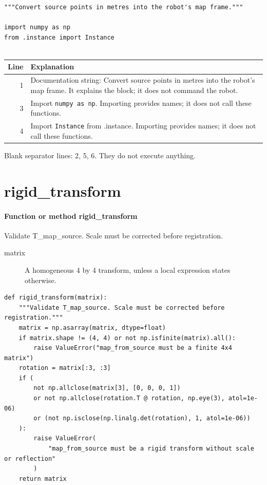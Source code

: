 \documentclass[11pt,a4paper]{book}
\begin{document}
\begin{lstlisting}[firstnumber=1]
"""Convert source points in metres into the robot's map frame."""

import numpy as np
from .instance import Instance


\end{lstlisting}

\begin{longtable}{r p{}}

\textbf{Line} & \textbf{Explanation} \\ \hline \endhead

1 & Documentation string: Convert source points in metres into the robot's map frame. It explains the block; it does not command the robot. \\

3 & Import \texttt{numpy as np}. Importing provides names; it does not call these functions. \\

4 & Import \texttt{Instance} from .instance. Importing provides names; it does not call these functions. \\

\end{longtable}

Blank separator lines: 2, 5, 6. They do not execute anything.

\section{rigid\_transform}

\paragraph{Function or method rigid\_transform}
Validate T\_map\_source. Scale must be corrected before registration.

\begin{description}
\item[matrix] A homogeneous 4 by 4 transform, unless a local expression states otherwise.
\end{description}

\begin{lstlisting}[firstnumber=7]
def rigid_transform(matrix):
    """Validate T_map_source. Scale must be corrected before registration."""
    matrix = np.asarray(matrix, dtype=float)
    if matrix.shape != (4, 4) or not np.isfinite(matrix).all():
        raise ValueError("map_from_source must be a finite 4x4 matrix")
    rotation = matrix[:3, :3]
    if (
        not np.allclose(matrix[3], [0, 0, 0, 1])
        or not np.allclose(rotation.T @ rotation, np.eye(3), atol=1e-06)
        or (not np.isclose(np.linalg.det(rotation), 1, atol=1e-06))
    ):
        raise ValueError(
            "map_from_source must be a rigid transform without scale or reflection"
        )
    return matrix


\end{lstlisting}
\end{document}
